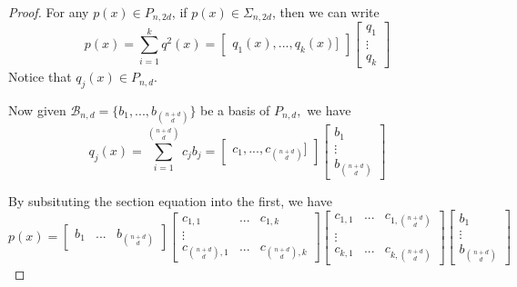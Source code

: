 \documentclass[12pt]{amsart}
\numberwithin{equation}{section}
\theoremstyle{definition}
\numberwithin{thm}{section}
\begin{document}
\begin{proof}
     For any $p(x) \in P_{n, 2d}$, if $p(x) \in \Sigma_{n, 2d}$, then we can write 
     \begin{equation}
          p(x) = \sum_{i = 1} ^ k q^2(x) = \begin{bmatrix} q_1(x),... ,q_k(x)] \end{bmatrix}  \begin{bmatrix} q_1 \\ \vdots \\ q_{k} \end{bmatrix}
     \end{equation}
     Notice that $q_j(x) \in P_{n, d}.$ 
     
     Now given $\mathcal{B}_{n, d} = \{b_1, ..., b_{n + d \choose d}\}$ be a basis of $P_{n, d},$ 
     we have 
     \begin{equation} q_j(x) = \sum_{i = 1}^{n + d \choose d} c_j b_j = \begin{bmatrix} c_1,..., c_{n + d \choose d}] \end{bmatrix} \begin{bmatrix} b_1 \\ \vdots \\ b_{n + d \choose d} \end{bmatrix} \end{equation}

     By subsituting the section equation into the first, we have
     \begin{equation}
          p(x) = 
               \begin{bmatrix} b_1 & ...& b_{n + d \choose d}
               \end{bmatrix} 
               \begin{bmatrix}
               c_{1,1} & ... & c_{1,k} \\
               \vdots\\
               c_{{n + d \choose d},1} & ... & c_{{n + d \choose d},k}
               \end{bmatrix}
               \begin{bmatrix}
                    c_{1,1} & ... & c_{1,{n + d \choose d}} \\
                    \vdots\\
                    c_{k,1} & ... & c_{k, {n + d \choose d}}
               \end{bmatrix}
               \begin{bmatrix} b_1 \\ \vdots \\ b_{n + d \choose d}
               \end{bmatrix} 
     \end{equation}


\end{proof}
\end{document}
